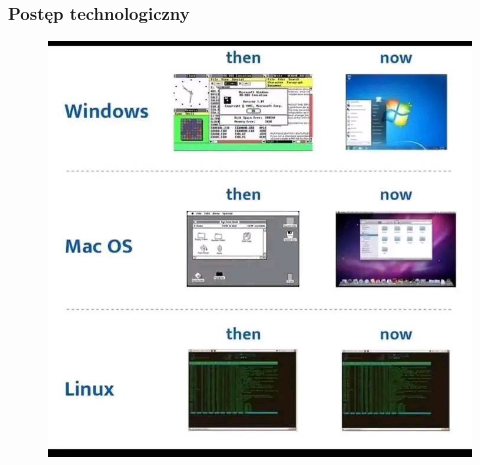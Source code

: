 \documentclass[10pt,t]{beamer}
\begin{document}
\begin{frame}
  \frametitle{Postęp technologiczny}

  \vspace{-0.5em}


  \begin{figure}

    \label{fig:Evolution-of-OS}

    \centering


    \includegraphics[scale=0.3]
    {./Presentations-pictures/Miscancellous-pictures/Evolution-of-operating-systems.jpg}

  \end{figure}

\end{frame}
\end{document}

